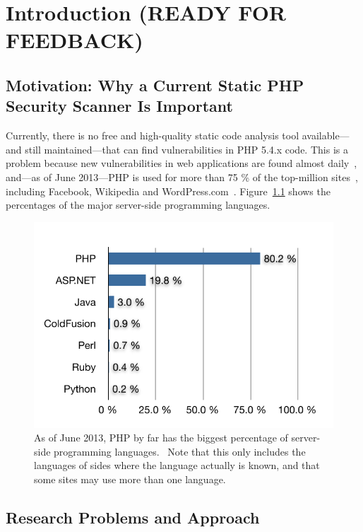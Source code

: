 \chapter{Introduction (READY FOR FEEDBACK)}

\section{Motivation: Why a Current Static PHP Security Scanner Is Important}
Currently, there is no free and high-quality static code analysis tool available---and still maintained---that can find vulnerabilities in PHP 5.4.x code. This is a problem because new vulnerabilities in web applications are found almost daily~\cite{osvdb}, and---as of June 2013---PHP is used for more than 75 \% of the top-million sites~\cite{w3techs-php-usage}, including Facebook, Wikipedia and WordPress.com~\cite{w3techs-php-sites}. Figure~\ref{fig:php-percentage} shows the percentages of the major server-side programming languages.

\begin{figure}[htb]
  \begin{center}
    \includegraphics[scale=1.0]{images/language-percentage}
    \caption{As of June 2013, PHP by far has the biggest percentage of server-side programming languages.~\cite{w3techs-php-usage} Note that this only includes the languages of sides where the language actually is known, and that some sites may use more than one language.}
    \label{fig:php-percentage}
  \end{center}
\end{figure}


\section{Research Problems and Approach}

